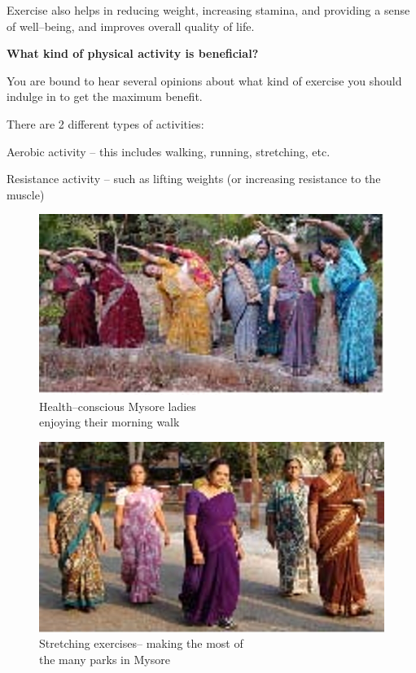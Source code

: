 Exercise also helps in reducing weight, increasing stamina, and providing a sense of well–being, and improves overall quality of life.

\textbf{What kind of physical activity is beneficial?}

You are bound to hear several opinions about what kind of exercise you should indulge in to get the maximum benefit.

There are 2 different types of activities:

\item Aerobic activity – this includes walking, running, stretching, etc.

 \item Resistance activity – such as lifting weights (or increasing resistance to the muscle)


\begin{figure}
\includegraphics{images/084.jpg}
\caption{Health–conscious Mysore ladies\\ enjoying their morning walk}
\end{figure}


\begin{figure}
\includegraphics{images/085.jpg}
\caption{Stretching exercises– making the most of\\ the many parks in Mysore}
\end{figure}


